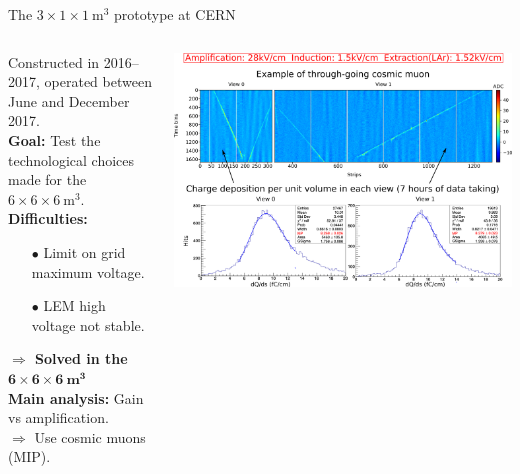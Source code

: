 \documentclass[10pt]{beamer}
\begin{document}
    \begin{frame}{The \texorpdfstring{$3 \times 1 \times \SI{1}{\meter\cubed}$}{311} prototype at CERN}
    	\begin{scriptsize}
    		\vfill
    		\begin{columns}
    			\begin{column}{0.4\textwidth}
    				Constructed in 2016--2017, operated between June and December 2017.\\
    				\vspace{0.3cm}
    				\textbf{Goal:} Test the technological choices made for the $6 \times 6 \times \SI{6}{\meter\cubed}$.\\
    				\vspace{0.3cm}
    				\textbf{Difficulties:} 
    				\begin{itemize}
    					\item[$\bullet$] Limit on grid maximum voltage.
    					\item[$\bullet$] LEM high voltage not stable.
    				\end{itemize}
    				\textbf{$\Rightarrow$ Solved in the $\mathbf{6 \times 6 \times \SI[detect-weight
    						]{6}{\meter\cubed}}$}\\
    				\vspace{0.3cm}
    				\textbf{Main analysis:} Gain vs amplification.\\
    				$\Rightarrow$ Use cosmic muons (MIP).
    			\end{column}\hfill
    			\begin{column}{0.6\textwidth}
    				\includegraphics[width=\textwidth]{figures/311/run840.png}\\
    			\end{column}
    		\end{columns}
	    \end{scriptsize}
    \end{frame}
    
\end{document}
